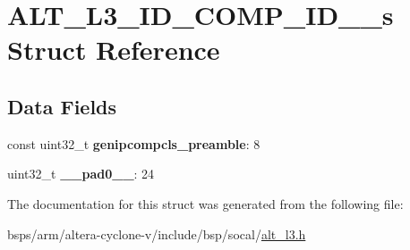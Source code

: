 \hypertarget{structALT__L3__ID__COMP__ID__1__s}{}\section{A\+L\+T\+\_\+\+L3\+\_\+\+I\+D\+\_\+\+C\+O\+M\+P\+\_\+\+I\+D\+\_\+\_\+s Struct Reference}
\label{structALT__L3__ID__COMP__ID__1__s}
\subsection*{Data Fields}
\begin{DoxyCompactItemize}
\item 
\mbox{\label{structALT__L3__ID__COMP__ID__1__s_a0d696e97b81b592dc3f1fcb7e48143d1}} 
const uint32\+\_\+t {\bfseries genipcompcls\+\_\+preamble}\+: 8
\item 
\mbox{\label{structALT__L3__ID__COMP__ID__1__s_aa576992ee59be8817cf74add0dea6192}} 
uint32\+\_\+t {\bfseries \+\_\+\+\_\+pad0\+\_\+\+\_\+}\+: 24
\end{DoxyCompactItemize}


The documentation for this struct was generated from the following file\+:\begin{DoxyCompactItemize}
\item 
bsps/arm/altera-\/cyclone-\/v/include/bsp/socal/\mbox{\hyperlink{alt__l3_8h}{alt\+\_\+l3.\+h}}\end{DoxyCompactItemize}
